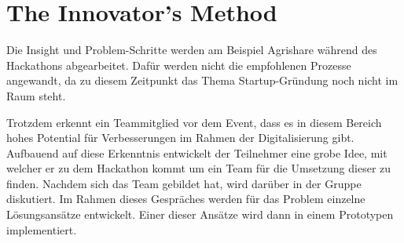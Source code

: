 \section{The Innovator's Method}
Die Insight und Problem-Schritte werden am Beispiel Agrishare während des Hackathons abgearbeitet. Dafür werden nicht die empfohlenen Prozesse angewandt, da zu diesem Zeitpunkt das Thema Startup-Gründung noch nicht im Raum steht.

Trotzdem erkennt ein Teammitglied vor dem Event, dass es in diesem Bereich hohes Potential für Verbesserungen im Rahmen der Digitalisierung gibt. Aufbauend auf diese Erkenntnis entwickelt der Teilnehmer eine grobe Idee, mit welcher er zu dem Hackathon kommt um ein Team für die Umsetzung dieser zu finden. Nachdem sich das Team gebildet hat, wird darüber in der Gruppe diskutiert. Im Rahmen dieses Gespräches werden für das Problem einzelne Lösungsansätze entwickelt. Einer dieser Ansätze wird dann in einem Prototypen implementiert.